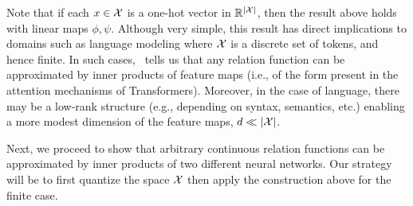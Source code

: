 Note that if each $x \in {\mathcal{X}}$ is a one-hot vector in $\mathbb{R}^{\left\lvert{\mathcal{X}}\right\rvert}$, then the result above holds with linear maps $\phi, \psi$. Although very simple, this result has direct implications to domains such as language modeling where ${\mathcal{X}}$ is a discrete set of tokens, and hence finite. In such cases,~ tells us that any relation function can be approximated by inner products of feature maps (i.e., of the form present in the attention mechanisms of Transformers). Moreover, in the case of language, there may be a low-rank structure (e.g., depending on syntax, semantics, etc.) enabling a more modest dimension of the feature maps, $d \ll \left\lvert{\mathcal{X}}\right\rvert$.

Next, we proceed to show that arbitrary continuous relation functions can be approximated by inner products of two different neural networks. Our strategy will be to first quantize the space ${\mathcal{X}}$ then apply the construction above for the finite case.

